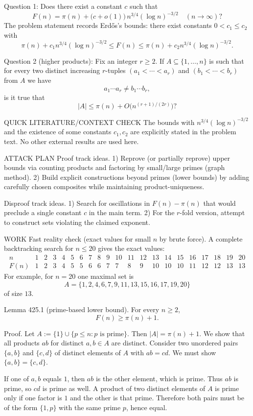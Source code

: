 Question 1: Does there exist a constant $c$ such that
\[
F(n)=\pi(n)+\bigl(c+o(1)\bigr)\,n^{3/4}(\log n)^{-3/2}\quad (n\to\infty)?
\]
The problem statement records Erd\H{o}s’s bounds: there exist constants $0<c_1\le c_2$ with
\[
\pi(n)+c_1 n^{3/4}(\log n)^{-3/2}\le F(n)\le \pi(n)+c_2 n^{3/4}(\log n)^{-3/2}.
\]

Question 2 (higher products): Fix an integer $r\ge 2$. If $A\subseteq\{1,\dots,n\}$ is such that for every two distinct increasing $r$-tuples $(a_1<\cdots<a_r)$ and $(b_1<\cdots<b_r)$ from $A$ we have
\[
 a_1\cdots a_r\ne b_1\cdots b_r,
\]
is it true that
\[
|A|\le \pi(n)+O\bigl(n^{(r+1)/(2r)}\bigr)?
\]

QUICK LITERATURE/CONTEXT CHECK
The bounds with $n^{3/4}(\log n)^{-3/2}$ and the existence of some constants $c_1,c_2$ are explicitly stated in the problem text. No other external results are used here.

ATTACK PLAN
Proof track ideas.
1) Reprove (or partially reprove) upper bounds via counting products and factoring by small/large primes (graph method).
2) Build explicit constructions beyond primes (lower bounds) by adding carefully chosen composites while maintaining product-uniqueness.

Disproof track ideas.
1) Search for oscillations in $F(n)-\pi(n)$ that would preclude a single constant $c$ in the main term.
2) For the $r$-fold version, attempt to construct sets violating the claimed exponent.

WORK
Fast reality check (exact values for small $n$ by brute force).
A complete backtracking search for $n\le 20$ gives the exact values:
\[
\begin{array}{c|cccccccccccccccccccc}
 n&1&2&3&4&5&6&7&8&9&10&11&12&13&14&15&16&17&18&19&20\\\hline
 F(n)&1&2&3&4&5&5&6&6&7&7&8&9&10&10&10&11&12&12&13&13
\end{array}
\]
For example, for $n=20$ one maximal set is
\[
A=\{1,2,4,6,7,9,11,13,15,16,17,19,20\}
\]
of size $13$.

Lemma 425.1 (prime-based lower bound).
For every $n\ge 2$,
\[
F(n)\ge \pi(n)+1.
\]

Proof.
Let $A:=\{1\}\cup\{p\le n: p\text{ is prime}\}$. Then $|A|=\pi(n)+1$.
We show that all products $ab$ for distinct $a,b\in A$ are distinct.
Consider two unordered pairs $\{a,b\}$ and $\{c,d\}$ of distinct elements of $A$ with $ab=cd$.
We must show $\{a,b\}=\{c,d\}$.

If one of $a,b$ equals $1$, then $ab$ is the other element, which is prime. Thus $ab$ is prime, so $cd$ is prime as well. A product of two distinct elements of $A$ is prime only if one factor is $1$ and the other is that prime. Therefore both pairs must be of the form $\{1,p\}$ with the same prime $p$, hence equal.


